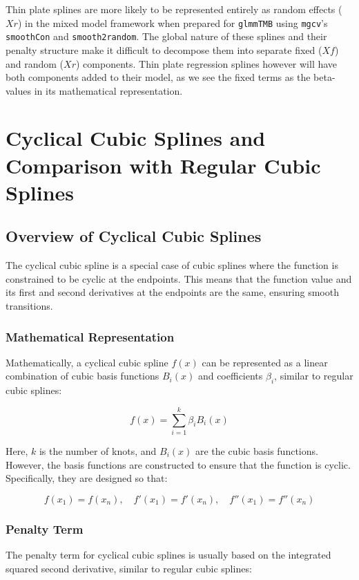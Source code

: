 \documentclass{article}
\begin{document}
Thin plate splines are more likely to be represented entirely as random effects (\(Xr\)) in the mixed model framework when prepared for \texttt{glmmTMB} using \texttt{mgcv}'s \texttt{smoothCon} and \texttt{smooth2random}. The global nature of these splines and their penalty structure make it difficult to decompose them into separate fixed (\(Xf\)) and random (\(Xr\)) components. Thin plate regression splines however will have both components added to their model, as we see the fixed terms as the beta-values in its mathematical representation.


\section{Cyclical Cubic Splines and Comparison with Regular Cubic Splines}

\subsection{Overview of Cyclical Cubic Splines}

The cyclical cubic spline is a special case of cubic splines where the function is constrained to be cyclic at the endpoints. This means that the function value and its first and second derivatives at the endpoints are the same, ensuring smooth transitions.

\subsubsection{Mathematical Representation}

Mathematically, a cyclical cubic spline \( f(x) \) can be represented as a linear combination of cubic basis functions \( B_i(x) \) and coefficients \( \beta_i \), similar to regular cubic splines:

\[
f(x) = \sum_{i=1}^{k} \beta_i B_i(x)
\]

Here, \( k \) is the number of knots, and \( B_i(x) \) are the cubic basis functions. However, the basis functions are constructed to ensure that the function is cyclic. Specifically, they are designed so that:

\[
f(x_1) = f(x_n), \quad f'(x_1) = f'(x_n), \quad f''(x_1) = f''(x_n)
\]

\subsubsection{Penalty Term}

The penalty term for cyclical cubic splines is usually based on the integrated squared second derivative, similar to regular cubic splines:
\end{document}
